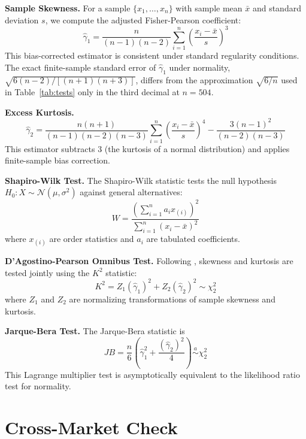 \documentclass[11pt]{article}
\begin{document}
\textbf{Sample Skewness.} For a sample $\{x_1, \ldots, x_n\}$ with sample mean $\bar{x}$ and standard deviation $s$, we compute the adjusted Fisher-Pearson coefficient:
\begin{equation}
    \hat{\gamma}_1 = \frac{n}{(n-1)(n-2)} \sum_{i=1}^{n} \left( \frac{x_i - \bar{x}}{s} \right)^3
\end{equation}
This bias-corrected estimator is consistent under standard regularity conditions. The exact finite-sample standard error of $\hat{\gamma}_1$ under normality, $\sqrt{6(n-2)/[(n+1)(n+3)]}$, differs from the approximation $\sqrt{6/n}$ used in Table~\ref{tab:tests} only in the third decimal at $n = 504$.

\textbf{Excess Kurtosis.}
\begin{equation}
    \hat{\gamma}_2 = \frac{n(n+1)}{(n-1)(n-2)(n-3)} \sum_{i=1}^{n} \left( \frac{x_i - \bar{x}}{s} \right)^4 - \frac{3(n-1)^2}{(n-2)(n-3)}
\end{equation}
This estimator subtracts 3 (the kurtosis of a normal distribution) and applies finite-sample bias correction.

\textbf{Shapiro-Wilk Test.} The Shapiro-Wilk statistic \citep{shapiro1965analysis} tests the null hypothesis $H_0: X \sim \mathcal{N}(\mu, \sigma^2)$ against general alternatives:
\begin{equation}
    W = \frac{\left( \sum_{i=1}^{n} a_i x_{(i)} \right)^2}{\sum_{i=1}^{n} (x_i - \bar{x})^2}
\end{equation}
where $x_{(i)}$ are order statistics and $a_i$ are tabulated coefficients.

\textbf{D'Agostino-Pearson Omnibus Test.} Following \citet{dagostino1990suggestion}, skewness and kurtosis are tested jointly using the $K^2$ statistic:
\begin{equation}
    K^2 = Z_1(\hat{\gamma}_1)^2 + Z_2(\hat{\gamma}_2)^2 \sim \chi^2_2
\end{equation}
where $Z_1$ and $Z_2$ are normalizing transformations of sample skewness and kurtosis.

\textbf{Jarque-Bera Test.} The Jarque-Bera statistic \citep{jarque1980efficient} is
\begin{equation}
    JB = \frac{n}{6} \left( \hat{\gamma}_1^2 + \frac{(\hat{\gamma}_2)^2}{4} \right) \stackrel{a}{\sim} \chi^2_2
\end{equation}
This Lagrange multiplier test is asymptotically equivalent to the likelihood ratio test for normality.

\section{Cross-Market Check}
\label{appendix:crossmarket}
\end{document}
